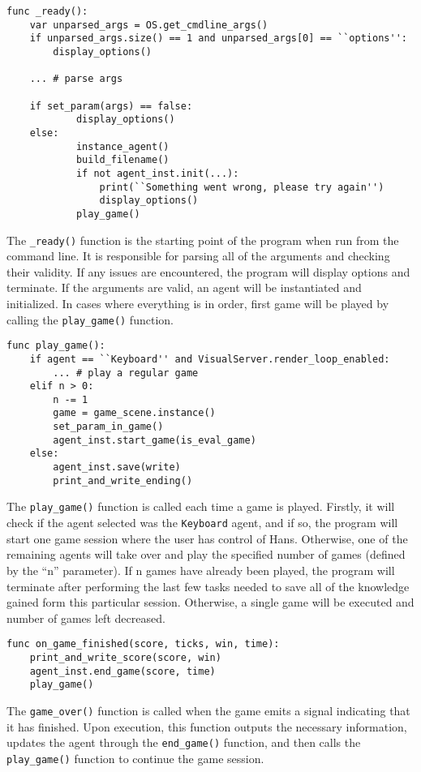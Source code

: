 \begin{center}
\hrulefill
\begin{lstlisting}
func _ready():
	var unparsed_args = OS.get_cmdline_args()
	if unparsed_args.size() == 1 and unparsed_args[0] == ``options'':
		display_options()
		
	...	# parse args
	
	if set_param(args) == false:
    		display_options()
	else:
    		instance_agent()
    		build_filename()
    		if not agent_inst.init(...):
        		print(``Something went wrong, please try again'')
        		display_options()
    		play_game()
\end{lstlisting}
\hrulefill
\end{center}

The \texttt{\_ready()} function is the starting point of the program when run from the command line. It is responsible for parsing all of the arguments and checking their validity. If any issues are encountered, the program will display options and terminate. If the arguments are valid, an agent will be instantiated and initialized. In cases where everything is in order, first game will be played by calling the \texttt{play\_game()} function.

\begin{center}
\hrulefill
\begin{lstlisting}
func play_game():
	if agent == ``Keyboard'' and VisualServer.render_loop_enabled:
		... # play a regular game
	elif n > 0:
		n -= 1
		game = game_scene.instance()
		set_param_in_game()
		agent_inst.start_game(is_eval_game)
	else:
		agent_inst.save(write)
		print_and_write_ending()
\end{lstlisting}
\hrulefill
\end{center}

The \texttt{play\_game()} function is called each time a game is played. Firstly, it will check if the agent selected was the \texttt{Keyboard} agent, and if so, the program will start one game session where the user has control of Hans. Otherwise, one of the remaining agents will take over and play the specified number of games (defined by the ``n'' parameter). If n games have already been played, the program will terminate after performing the last few tasks needed to save all of the knowledge gained form this particular session. Otherwise, a single game will be executed and number of games left decreased.

\begin{center}
\hrulefill
\begin{lstlisting}
func on_game_finished(score, ticks, win, time):
	print_and_write_score(score, win)
	agent_inst.end_game(score, time)
	play_game()
\end{lstlisting}
\hrulefill
\end{center}



The \texttt{game\_over()} function is called when the game emits a signal indicating that it has finished. Upon execution, this function outputs the necessary information, updates the agent through the \texttt{end\_game()} function, and then calls the \texttt{play\_game()} function to continue the game session.